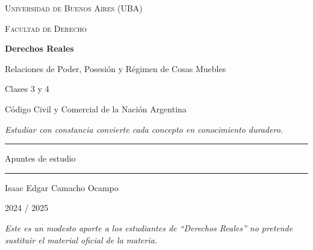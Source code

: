 \documentclass[12pt,oneside]{book}
\newcommand{\universidad}{Universidad de Buenos Aires (UBA)}
\newcommand{\facultad}{Facultad de Derecho}
\newcommand{\materia}{Derechos Reales}
\newcommand{\titulo}{Relaciones de Poder, Posesión y Régimen de Cosas Muebles}
\newcommand{\subtitulo}{Clases 3 y 4}
\newcommand{\normativa}{Código Civil y Comercial de la Nación Argentina}
\newcommand{\autor}{Isaac Edgar Camacho Ocampo}
\newcommand{\anio}{2024 / 2025}
\begin{document}
\begin{titlepage}

\thispagestyle{empty}

\begin{center}

\vspace*{1cm}

{\large \textsc{\universidad}}

\vspace{0.2cm}

{\large \textsc{\facultad}}

\vspace{3cm}

{\Huge \textbf{\materia}}

\vspace{1cm}

{\LARGE \titulo}

\vspace{0.4cm}

{\large \subtitulo}

\vspace{0.2cm}

{\normalsize \normativa}

\vspace{0.8cm}

\textit{Estudiar con constancia convierte cada concepto en conocimiento duradero.}

\vspace{1.2cm}

\rule{0.70\textwidth}{0.5pt}

\vspace{0.5cm}

{\large Apuntes de estudio}

\vspace{0.5cm}

\rule{0.70\textwidth}{0.5pt}

\vfill

{\large \autor}

\vspace{0.3cm}

{\large \anio}

\end{center}

\vfill

\begin{flushleft}
\textit{Este es un modesto aporte a los estudiantes de ``\materia'' no pretende sustituir el material oficial de la materia.}
\end{flushleft}

\end{titlepage}
\end{document}
